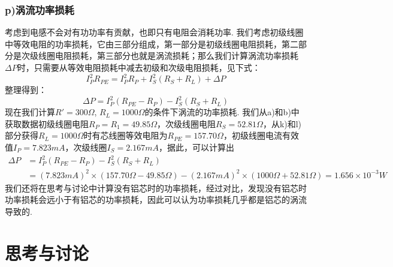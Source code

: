 \documentclass[UTF8]{ctexart}
\begin{document}
\subsubsection*{p)涡流功率损耗}
考虑到电感不会对有功功率有贡献，也即只有电阻会消耗功率. 我们考虑初级线圈中等效电阻的功率损耗，它由三部分组成，第一部分是初级线圈电阻损耗，第二部分是次级线圈电阻损耗，第三部分也就是涡流损耗；那么我们计算涡流功率损耗$\Delta P$时，只需要从等效电阻损耗中减去初级和次级电阻损耗，见下式：
\begin{equation}
    I_P^2R_{PE}=I_P^2R_P+I_S^2(R_S+R_L)+\Delta P
\end{equation}
整理得到：
\begin{equation}
        \Delta P=I_P^2(R_{PE}-R_P)-I_S^2(R_S+R_L)
\end{equation}
现在我们计算$R'=300\Omega$, $R_L=1000\Omega$的条件下涡流的功率损耗. 我们从a)和b)中获取数据初级线圈电阻$R_P=R_1=49.85\Omega$，次级线圈电阻$R_S=52.81\Omega$，从k)和l)部分获得$R_L=1000\Omega$时有芯线圈等效电阻为$R_{PE}=157.70\Omega$，初级线圈电流有效值$I_P=7.823mA$，次级线圈$I_S=2.167mA$，据此，可以计算出
$$
\begin{aligned}
    \Delta P&=I_P^2(R_{PE}-R_P)-I_S^2(R_S+R_L)\\
    &=(7.823mA)^2\times(157.70\Omega-49.85\Omega)-(2.167mA)^2\times(1000\Omega+52.81\Omega)=1.656\times 10^{-3}W
\end{aligned}
$$
我们还将在思考与讨论中计算没有铝芯时的功率损耗，经过对比，发现没有铝芯时功率损耗会远小于有铝芯的功率损耗，因此可以认为功率损耗几乎都是铝芯的涡流导致的.

\section{思考与讨论}
\end{document}
